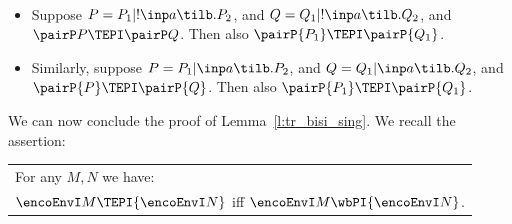 \begin{lemma}
\label{l:par_tr}
$ $ 
\begin{itemize}
\item
Suppose $P = P_1 | ! \inp a {\tilb}.P_2$, 
and $Q = Q_1 | ! \inp a {\tilb}.Q_2$, 
and  $\pairP P \TEPI \pairP Q$.
Then also 
  $\pairP {P_1}  \TEPI \pairP {Q_1}$.


\item 
Similarly, suppose $P = P_1 |  \inp a {\tilb}.P_2$, 
and $Q = Q_1 |  \inp a {\tilb}.Q_2$, 
and  $\pairP {P} \TEPI \pairP {Q}$.
Then also 
  $\pairP {P_1}  \TEPI \pairP {Q_1}$.
\end{itemize}
 \end{lemma} 
\noindent
We can now conclude the proof of 
Lemma~\ref{l:tr_bisi_sing}.
We recall the assertion:
\begin{center}
\begin{tabular}{l}
For any $M,N$ we have:  \\
$
{\encoEnvI M} \TEPI {\encoEnvI N}
$ iff 
${\encoEnvI M} \wbPI {\encoEnvI N}$.
\end{tabular} 
\end{center} 

